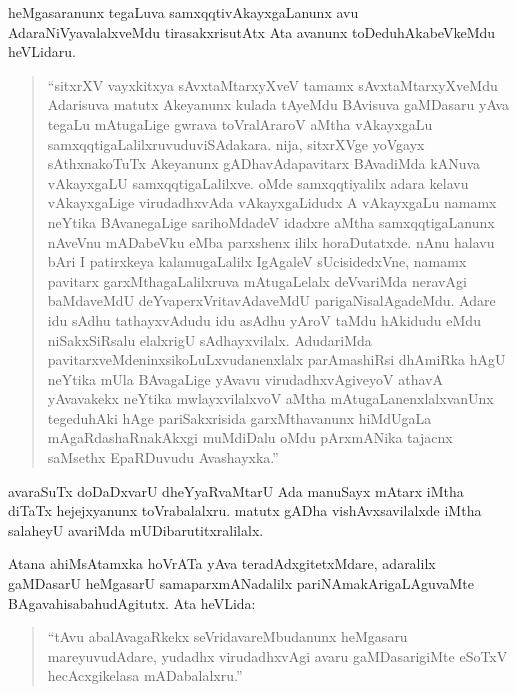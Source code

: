 heMgasaranunx tegaLuva samxqqtivAkayxgaLanunx avu AdaraNiVyavalalxveMdu tirasakxri\-sutAtx Ata avanunx toDeduhAkabeVkeMdu heVLidaru.
\begin{quote}
``sitxrXV vayxkitxya sAvxtaMtarxyXveV tamamx sAvxtaMtarxyXveMdu Adarisuva matutx Ake\-yanunx kulada tAyeMdu BAvisuva gaMDasaru yAva tegaLu mAtu\-gaLige gwrava toVralAraroV aMtha vAkayxgaLu samxqqtigaLalilxruvudu\break viSAdakara. nija, sitxrXVge yoVgayx sAthxnakoTuTx Akeyanunx gADhavAda\break pavitarx BAvadiMda kANuva vAkayxgaLU samxqqtigaLalilxve. oMde samxqqtiyalilx adara kelavu vAkayxgaLige virudadhxvAda vAkayxgaLidudx A vAkayxgaLu namamx neYtika BAvanegaLige sarihoMdadeV idadxre aMtha samxqqtigaLanunx nAveVnu mADabeVku eMba parxshenx ililx horaDutatxde. nAnu halavu bAri I patirxkeya kalamugaLalilx IgAgaleV sUcisidedxVne, namamx pavitarx garxMtha\-gaLalilxruva mAtugaLelalx deVvariMda neravAgi baMdaveMdU deYvaperxVrita\-vAdaveMdU parigaNisalAgadeMdu. Adare idu sAdhu tathayxvAdudu idu asAdhu yAroV taMdu hAkidudu eMdu niSakxSiRsalu elalxrigU sAdhayxvilalx. AdudariMda pavitarxveMdeninxsikoLuLxvudanenxlalx parAmashiRsi dhAmiRka hAgU neYtika mUla BAvagaLige yAvavu virudadhxvAgiveyoV athavA yAvavakekx neYtika mwlayxvilalxvoV aMtha mAtugaLanenxlalxvanUnx tegeduhAki hAge pariSakxrisida garxMthavanunx hiMdUgaLa mAgaRdashaRnakAkxgi muMdiDalu oMdu pArxmANika tajacnx saMsethx EpaRDuvudu Avashayxka.''
\end{quote}

avaraSuTx doDaDxvarU dheYyaRvaMtarU Ada manuSayx mAtarx iMtha diTaTx hejejxyanunx toVrabalalxru. matutx gADha vishAvxsavilalxde iMtha salaheyU avariMda mUDibarutitxralilalx.

Atana ahiMsAtamxka hoVrATa yAva teradAdxgitetxMdare, adaralilx gaMDasarU heMgasarU samaparxmANadalilx pariNAmakArigaLAguvaMte BAgavahisabahudAgitutx. Ata heVLida:
\begin{quote}
``tAvu abalAvagaRkekx seVridavareMbudanunx heMgasaru mareyuvudAdare, yudadhx virudadhxvAgi avaru gaMDasarigiMte eSoTxV hecAcxgi\break kelasa mADabalalxru.''
\end{quote}

